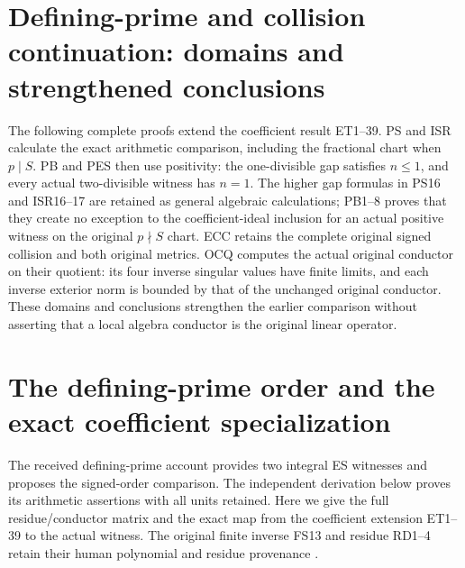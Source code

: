 \documentclass[11pt]{article}
\begin{document}
\section{Defining-prime and collision continuation: domains and strengthened conclusions}
The following complete proofs extend the coefficient result ET1--39.
PS and ISR calculate the exact arithmetic comparison, including the
fractional chart when $p\mid S$. PB and PES then use positivity:
the one-divisible gap satisfies $n\le1$, and every actual two-divisible
witness has $n=1$. The higher gap formulas in PS16 and ISR16--17 are
retained as general algebraic calculations; PB1--8 proves that they
create no exception to the coefficient-ideal inclusion for an actual
positive witness on the original $p\nmid S$ chart.
ECC retains the complete original signed collision and both original
metrics. OCQ computes the actual original conductor on their quotient:
its four inverse singular values have finite limits, and each inverse
exterior norm is bounded by that of the unchanged original conductor.
These domains and conclusions strengthen the earlier comparison without
asserting that a local algebra conductor is the original linear operator.

\section{The defining-prime order and the exact coefficient specialization}
The received defining-prime account \cite[eqs.\ (9)--(31)]{DefiningPrimeReceived}
provides two integral ES witnesses and proposes the signed-order comparison.
The independent derivation below proves its arithmetic assertions with all
units retained. Here we give the full residue/conductor matrix and the exact
map from the coefficient extension ET1--39 to the actual witness. The
original finite inverse FS13 and residue RD1--4 retain their human
polynomial and residue provenance \cite{ES488,Tao,JouveRV}.
\end{document}
